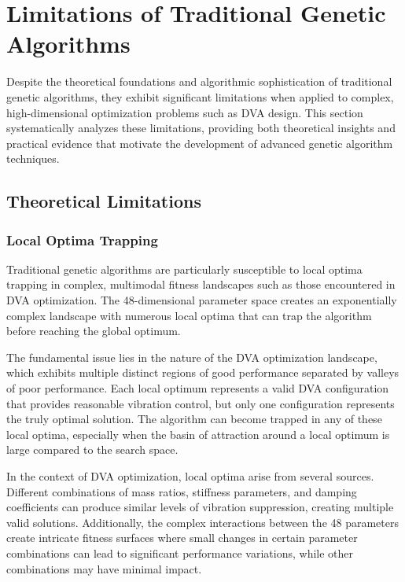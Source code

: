 \documentclass[12pt,a4paper]{article}
\begin{document}
\section{Limitations of Traditional Genetic Algorithms}

Despite the theoretical foundations and algorithmic sophistication of traditional genetic algorithms, they exhibit significant limitations when applied to complex, high-dimensional optimization problems such as DVA design. This section systematically analyzes these limitations, providing both theoretical insights and practical evidence that motivate the development of advanced genetic algorithm techniques.

\subsection{Theoretical Limitations}

\subsubsection{Local Optima Trapping}

Traditional genetic algorithms are particularly susceptible to local optima trapping in complex, multimodal fitness landscapes such as those encountered in DVA optimization. The 48-dimensional parameter space creates an exponentially complex landscape with numerous local optima that can trap the algorithm before reaching the global optimum.

The fundamental issue lies in the nature of the DVA optimization landscape, which exhibits multiple distinct regions of good performance separated by valleys of poor performance. Each local optimum represents a valid DVA configuration that provides reasonable vibration control, but only one configuration represents the truly optimal solution. The algorithm can become trapped in any of these local optima, especially when the basin of attraction around a local optimum is large compared to the search space.

In the context of DVA optimization, local optima arise from several sources. Different combinations of mass ratios, stiffness parameters, and damping coefficients can produce similar levels of vibration suppression, creating multiple valid solutions. Additionally, the complex interactions between the 48 parameters create intricate fitness surfaces where small changes in certain parameter combinations can lead to significant performance variations, while other combinations may have minimal impact.
\end{document}
